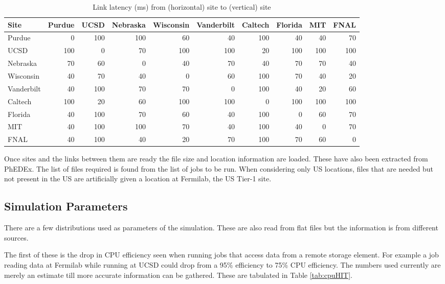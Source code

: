 \documentclass[a4paper]{jpconf}
\begin{document}
\begin{table}
  \begin{center}
    \begin{footnotesize}
      \begin{tabular}{|l|rrrrrrrrr|}
        \hline
        Site & Purdue & UCSD & Nebraska & Wisconsin & Vanderbilt & Caltech & Florida & MIT & FNAL \\
        \hline
        Purdue & 0 & 100 & 100 & 60 & 40 & 100 & 40 & 40 & 70 \\
        UCSD & 100 & 0 & 70 & 100 & 100 & 20 & 100 & 100 & 100 \\
        Nebraska & 70 & 60 & 0 & 40 & 70 & 40 & 70 & 70 & 40 \\
        Wisconsin & 40 & 70 & 40 & 0 & 60 & 100 & 70 & 40 & 20 \\
        Vanderbilt & 40 & 100 & 70 & 70 & 0 & 100 & 40 & 20 & 60 \\
        Caltech & 100 & 20 & 60 & 100 & 100 & 0 & 100 & 100 & 100 \\
        Florida & 40 & 100 & 70 & 60 & 40 & 100 & 0 & 60 & 70 \\
        MIT & 40 & 100 & 100 & 70 & 40 & 100 & 40 & 0 & 70 \\
        FNAL & 40 & 100 & 40 & 20 & 70 & 100 & 70 & 60 & 0 \\
        \hline
      \end{tabular}
      \caption{Link latency (ms) from (horizontal) site to (vertical) site\label{tab:latency}}
    \end{footnotesize}
  \end{center}
\end{table}

Once sites and the links between them are ready the file size and
location information are loaded. These have also been extracted from
PhEDEx. The list of files required is found from the list of jobs to
be run. When considering only US locations, files that are needed but
not present in the US are artificially given a location at Fermilab,
the US Tier-1 site.

\subsection{Simulation Parameters}

There are a few distributions used as parameters of the
simulation. These are also read from flat files but the information is
from different sources.

The first of these is the drop in CPU efficiency seen when running
jobs that access data from a remote storage element. For example a job
reading data at Fermilab while running at UCSD could drop from a 95\%
efficiency to 75\% CPU efficiency. The numbers used currently are
merely an estimate till more accurate information can be
gathered. These are tabulated in Table \ref{tab:cpuHIT}.
\end{document}

